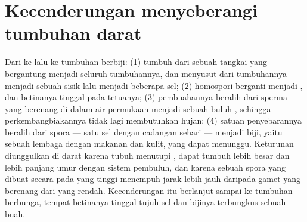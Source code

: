 \section{Kecenderungan menyeberangi tumbuhan darat}

\begin{proposition}\label{prop:b2:plant-life-cycles:trends}
Dari  ke  lalu ke tumbuhan berbiji: (1) 
tumbuh dari sebuah tangkai yang bergantung menjadi seluruh tumbuhannya,
dan  menyusut dari tumbuhannya menjadi sebuah sisik lalu
menjadi beberapa sel; (2) homospori berganti menjadi
, dan  betinanya tinggal pada tetuanya;
(3) pembuahannya beralih dari sperma yang berenang di dalam air
permukaan menjadi sebuah buluh , sehingga
perkembangbiakannya tidak lagi membutuhkan hujan; (4) satuan
penyebarannya beralih dari spora --- satu sel dengan cadangan sehari
--- menjadi biji, yaitu sebuah lembaga dengan makanan dan kulit, yang
dapat menunggu. Keturunan  diunggulkan di darat karena tubuh
 menutupi  , dapat tumbuh lebih besar dan lebih
panjang umur dengan sistem pembuluh, dan karena sebuah spora yang
dibuat secara  pada  yang tinggi menempuh jarak lebih
jauh daripada gamet yang berenang dari  yang rendah.
Kecenderungan itu berlanjut sampai ke tumbuhan berbunga, tempat
 betinanya tinggal tujuh sel dan bijinya terbungkus sebuah
buah.
\end{proposition}

